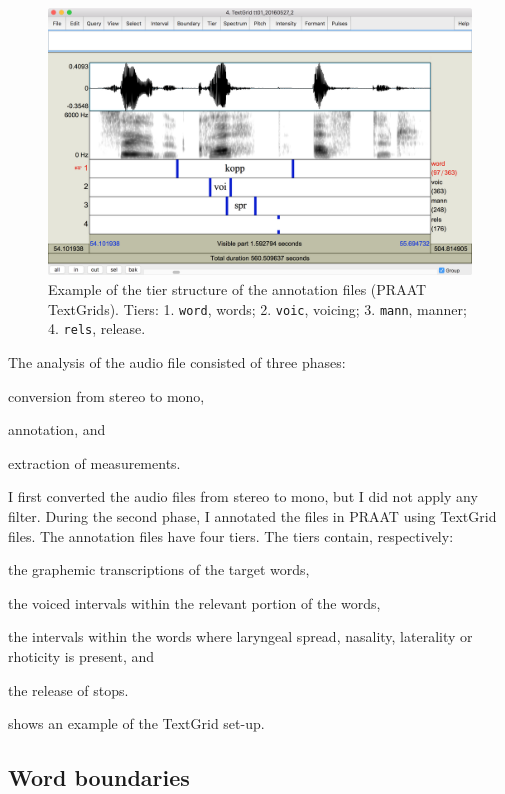 \documentclass[11pt,a4paper,openany]{memoir}\usepackage[]{graphicx}\usepackage[]{color}
\begin{document}
\begin{figure}
\centering
\includegraphics[width=.7\textwidth]{textgrid}
\caption{Example of the tier structure of the annotation files (PRAAT TextGrids). Tiers: 1. \texttt{word}, words; 2. \texttt{voic}, voicing; 3. \texttt{mann}, manner; 4. \texttt{rels}, release.}
\label{f:textgrid}
\end{figure}

The analysis of the audio file consisted of three phases:
\begin{inparaenum}[(1)]
	\item conversion from stereo to mono,
	\item annotation, and
	\item extraction of measurements.
\end{inparaenum}
I first converted the audio files from stereo to mono, but I did not apply any filter.
During the second phase, I annotated the files in PRAAT \citep{boersma2015} using TextGrid files.
The annotation files have four tiers.
The tiers contain, respectively: 
\begin{inparaenum}[(1)]
	\item the graphemic transcriptions of the target words,
	\item the voiced intervals within the relevant portion of the words, 
	\item the intervals within the words where laryngeal spread, nasality, laterality or rhoticity is present, and
	\item the release of stops.
\end{inparaenum}
 shows an example of the TextGrid set-up.

\subsection{Word boundaries}
\end{document}
